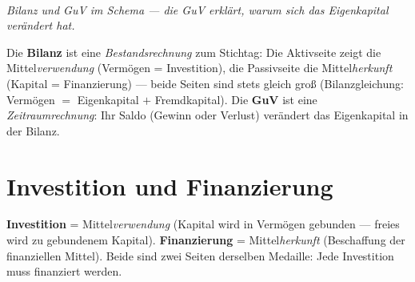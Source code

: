 \documentclass[11pt, a4paper]{article}
\begin{document}
\begin{center}
\\[0.3em]
{\small\itshape Bilanz und GuV im Schema --- die GuV erklärt, \emph{warum} sich das
Eigenkapital verändert hat.}
\end{center}

\begin{merksatz}
Die \textbf{Bilanz} ist eine \emph{Bestandsrechnung} zum Stichtag: Die Aktivseite zeigt
die Mittel\emph{verwendung} (Vermögen = Investition), die Passivseite die
Mittel\emph{herkunft} (Kapital = Finanzierung) --- beide Seiten sind stets gleich groß
(Bilanzgleichung: Vermögen $=$ Eigenkapital $+$ Fremdkapital). Die \textbf{GuV} ist
eine \emph{Zeitraumrechnung}: Ihr Saldo (Gewinn oder Verlust) verändert das
Eigenkapital in der Bilanz.
\end{merksatz}

\section{Investition und Finanzierung}

\begin{merksatz}
\textbf{Investition} = Mittel\emph{verwendung} (Kapital wird in Vermögen gebunden ---
freies wird zu gebundenem Kapital). \textbf{Finanzierung} = Mittel\emph{herkunft}
(Beschaffung der finanziellen Mittel). Beide sind zwei Seiten derselben Medaille: Jede
Investition muss finanziert werden.
\end{merksatz}
\end{document}
